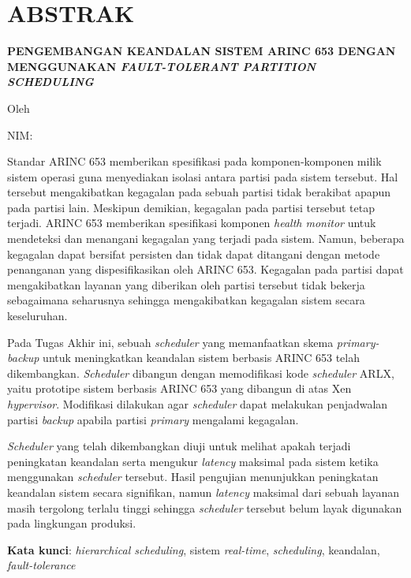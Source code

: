 \clearpage
\chapter*{ABSTRAK}

\begin{center}

	\large \bfseries
	\MakeUppercase{Pengembangan Keandalan Sistem ARINC 653 dengan Menggunakan
	\textit{Fault-Tolerant Partition Scheduling}}

	\normalsize \normalfont Oleh

	\large \penulis

	\large NIM: \nimpenulis

\end{center}

\singlespacing
Standar ARINC 653 memberikan spesifikasi pada komponen-komponen milik sistem operasi guna
menyediakan isolasi antara partisi pada sistem tersebut. Hal tersebut mengakibatkan kegagalan
pada sebuah partisi tidak berakibat apapun pada partisi lain. Meskipun demikian, kegagalan pada
partisi tersebut tetap terjadi. ARINC 653 memberikan spesifikasi komponen \textit{health
monitor} untuk mendeteksi dan menangani kegagalan yang terjadi pada sistem. Namun, beberapa
kegagalan dapat bersifat persisten dan tidak dapat ditangani dengan metode penanganan yang
dispesifikasikan oleh ARINC 653.  Kegagalan pada partisi dapat mengakibatkan layanan yang
diberikan oleh partisi tersebut tidak bekerja sebagaimana seharusnya sehingga mengakibatkan
kegagalan sistem secara keseluruhan.

Pada Tugas Akhir ini, sebuah \textit{scheduler} yang memanfaatkan skema \textit{primary-backup}
untuk meningkatkan keandalan sistem berbasis ARINC 653 telah dikembangkan.  \textit{Scheduler}
dibangun dengan memodifikasi kode \textit{scheduler} ARLX, yaitu prototipe sistem berbasis ARINC
653 yang dibangun di atas Xen \textit{hypervisor}. Modifikasi dilakukan agar \textit{scheduler}
dapat melakukan penjadwalan partisi \textit{backup} apabila partisi \textit{primary} mengalami
kegagalan.

\textit{Scheduler} yang telah dikembangkan diuji untuk melihat apakah terjadi peningkatan
keandalan serta mengukur \textit{latency} maksimal pada sistem ketika menggunakan
\textit{scheduler} tersebut. Hasil pengujian menunjukkan peningkatan keandalan sistem secara
signifikan, namun \textit{latency} maksimal dari sebuah layanan masih tergolong terlalu tinggi
sehingga \textit{scheduler} tersebut belum layak digunakan pada lingkungan produksi.

\textbf{Kata kunci}: \textit{hierarchical scheduling}, sistem \textit{real-time},
\textit{scheduling}, keandalan, \textit{fault-tolerance}

\clearpage

